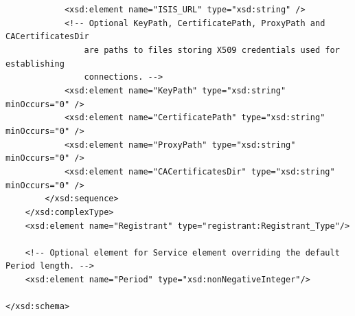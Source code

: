 \documentclass{article}                            %
\newcommand{\GT}{Globus Toolkit\textsuperscript{\textregistered}}
\begin{document}
\begin{framed}
\verb#            <xsd:element name="ISIS_URL" type="xsd:string" />#\\
\verb#            <!-- Optional KeyPath, CertificatePath, ProxyPath and CACertificatesDir#\\
\verb#                are paths to files storing X509 credentials used for establishing#\\
\verb#                connections. -->#\\
\verb#            <xsd:element name="KeyPath" type="xsd:string" minOccurs="0" />#\\
\verb#            <xsd:element name="CertificatePath" type="xsd:string" minOccurs="0" />#\\
\verb#            <xsd:element name="ProxyPath" type="xsd:string" minOccurs="0" />#\\
\verb#            <xsd:element name="CACertificatesDir" type="xsd:string" minOccurs="0" />#\\
\verb#        </xsd:sequence>#\\
\verb#    </xsd:complexType>#\\
\verb#    <xsd:element name="Registrant" type="registrant:Registrant_Type"/>#\\
\verb# #\\
\verb#    <!-- Optional element for Service element overriding the default Period length. -->#\\
\verb#    <xsd:element name="Period" type="xsd:nonNegativeInteger"/>#\\
\verb# #\\
\verb#</xsd:schema>#\\
\end{framed}








\end{document}
